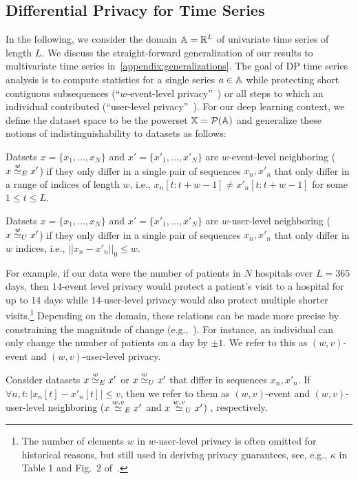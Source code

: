 \subsection{Differential Privacy for Time Series}
In the following, we consider the domain ${\mathbb{A}} = {\mathbb{R}}^L$ of univariate time series of length $L$.
We discuss the straight-forward generalization of our results to multivariate time series in~\cref{appendix:generalizations}.
The goal of DP time series analysis is to compute statistics for a single series $a \in {\mathbb{A}}$ while protecting short contiguous subsequences (``$w$-event-level privacy''~\cite{kellaris2014differentially}) or all steps to which an individual contributed (``user-level privacy''~\cite{dwork2010differential}).
For our deep learning context, we define the dataset space to be the powerset
${\mathbb{X}} = \mathcal{P}({\mathbb{A}})$ and generalize these notions of indistinguishability to datasets as follows:
\begin{definition}
    Datsets $x=\{x_1,\dots,x_N\}$ and $x'=\{x'_1, \dots, x'_N\}$
    are $w$-event-level neighboring ($x \overset{w}{\simeq}_{E} x'$) if they only differ in a single pair of sequences $x_n, x'_n$ that only differ in a range of indices of length $w$, i.e.,
    $x_n[t:t+w-1] \neq x'_n[t:t+w-1]$ for some $1 \leq t \leq L$.
\end{definition}
\begin{definition}
    Datsets $x=\{x_1,\dots,x_N\}$ and $x'=\{x'_1, \dots, x'_N\}$
    are $w$-user-level neighboring ($x \overset{w}{\simeq}_{U} x'$) if they only differ in a single pair of sequences $x_n, x'_n$ that only differ in $w$ indices, i.e., $||x_n - x'_n||_0 \leq w$.
\end{definition}
For example, if our data were the number of patients in $N$ hospitals over $L = 365$ days, then $14$-event level privacy would protect a patient's visit to a hospital for up to $14$ days while $14$-user-level privacy would also protect multiple shorter visits.\footnote{The number of elements $w$ in $w$-user-level privacy is often omitted for historical reasons, but still used in deriving privacy guarantees, see, e.g., $\kappa$ in Table 1 and Fig.\ 2 of~\cite{mao2024differential}.}
Depending on the domain, these relations can be made more precise by constraining the magnitude of change
(e.g.,~\cite{koga2022privacy}).
For instance, an individual can only change the number of patients on a day by $\pm 1$.
We refer to this as $(w,v)$-event and $(w,v)$-user-level privacy.
\begin{definition}\label{definition:bounded_neighboring_relations}
    Consider datasets $x \overset{w}{\simeq}_{E} x'$ or $x \overset{w}{\simeq}_{U} x'$ that differ in sequences $x_n, x'_n$.
    If $\forall n, t: |x_n[t] - x'_n[t]| \leq v$, then we refer to them as $(w,v)$-event and $(w,v)$-user-level neighboring
    ($x \overset{w,v }{\simeq}_{E} x'$ and $x \overset{w,v}{\simeq}_{U} x'$)
    , respectively.
\end{definition}
